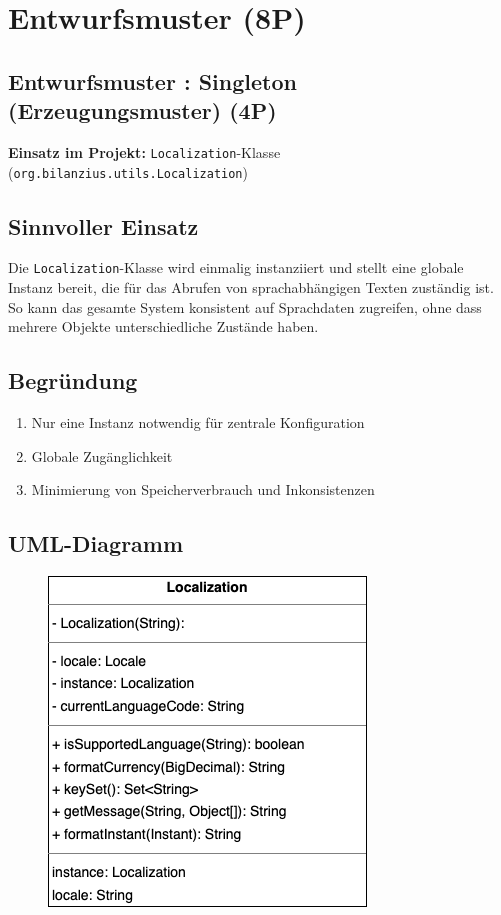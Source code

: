 \section{Entwurfsmuster (8P)}
\subsection{Entwurfsmuster : Singleton (Erzeugungsmuster) (4P)}
\textbf{Einsatz im Projekt:} \texttt{Localization}-Klasse (\texttt{org.bilanzius.utils.Localization})



\subsection*{Sinnvoller Einsatz}
Die \texttt{Localization}-Klasse wird einmalig instanziiert und stellt eine globale Instanz bereit, die für das Abrufen von sprachabhängigen Texten zuständig ist. So kann das gesamte System konsistent auf Sprachdaten zugreifen, ohne dass mehrere Objekte unterschiedliche Zustände haben.

\subsection*{Begründung}
\begin{enumerate}
    \item Nur eine Instanz notwendig für zentrale Konfiguration
    \item Globale Zugänglichkeit
    \item Minimierung von Speicherverbrauch und Inkonsistenzen
\end{enumerate}

\subsection*{UML-Diagramm}
\begin{figure}[htbp]
    \centering
    \includegraphics[width=0.5\linewidth]
    {kapitel8_entwurfsmuster/UMLs/localizaition.drawio.png}
\end{figure}


